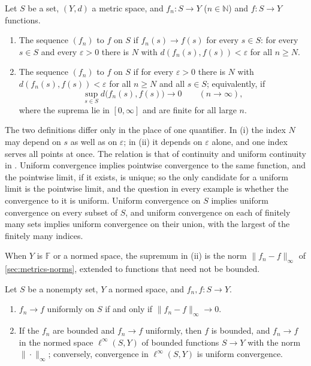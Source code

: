 \begin{definition}
\label{def:pointwise-uniform}
Let $S$ be a set, $(Y,d)$ a metric space, and $f_n\colon S\to Y$ ($n\in\mathbb N$) and $f\colon S\to Y$ functions.
\begin{enumerate}
\item The sequence $(f_n)$  to $f$ on $S$ if $f_n(s)\to f(s)$ for every $s\in S$: for every $s\in S$ and every $\varepsilon>0$ there is $N$ with $d(f_n(s),f(s))<\varepsilon$ for all $n\ge N$.
\item The sequence $(f_n)$  to $f$ on $S$ if for every $\varepsilon>0$ there is $N$ with $d(f_n(s),f(s))<\varepsilon$ for all $n\ge N$ and all $s\in S$; equivalently, if
\[
\sup_{s\in S}d\bigl(f_n(s),f(s)\bigr)\to0\qquad(n\to\infty),
\]
where the suprema lie in $[0,\infty]$ and are finite for all large $n$.
\end{enumerate}
\end{definition}

The two definitions differ only in the place of one quantifier. In (i) the index $N$ may depend on $s$ as well as on $\varepsilon$; in (ii) it depends on $\varepsilon$ alone, and one index serves all points at once. The relation is that of continuity and uniform continuity in . Uniform convergence implies pointwise convergence to the same function, and the pointwise limit, if it exists, is unique; so the only candidate for a uniform limit is the pointwise limit, and the question in every example is whether the convergence to it is uniform. Uniform convergence on $S$ implies uniform convergence on every subset of $S$, and uniform convergence on each of finitely many sets implies uniform convergence on their union, with the largest of the finitely many indices.

When $Y$ is $\mathbb F$ or a normed space, the supremum in (ii) is the norm $\|f_n-f\|_\infty$ of \cref{sec:metrics-norms}, extended to functions that need not be bounded.

\begin{proposition}
\label{prop:uniform-sup-norm}
Let $S$ be a nonempty set, $Y$ a normed space, and $f_n,f\colon S\to Y$.
\begin{enumerate}
\item $f_n\to f$ uniformly on $S$ if and only if $\|f_n-f\|_\infty\to0$.
\item If the $f_n$ are bounded and $f_n\to f$ uniformly, then $f$ is bounded, and $f_n\to f$ in the normed space $\ell^\infty(S,Y)$ of bounded functions $S\to Y$ with the norm $\|\cdot\|_\infty$; conversely, convergence in $\ell^\infty(S,Y)$ is uniform convergence.
\end{enumerate}
\end{proposition}

